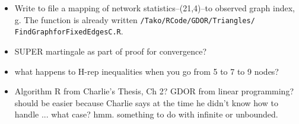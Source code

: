 \documentclass{amsbook}
\theoremstyle{definition}
\theoremstyle{remark}
\begin{document}
\begin{itemize}
\item Write to file a mapping of network statistics--(21,4)--to observed graph index, 
g.  The function is already written \texttt{/Tako/RCode/GDOR/Triangles/
FindGraphforFixedEdgesC.R}.
\item SUPER martingale as part of proof for convergence?
\item what happens to H-rep inequalities when you go from 5 to 7 to 9 nodes?
\item Algorithm R from Charlie's Thesis, Ch 2?  GDOR from linear programming?  should 
be easier because Charlie says at the time he didn't know how to handle ... what case?  
hmm.  something to do with infinite or unbounded.
\end{itemize}





\end{document}
